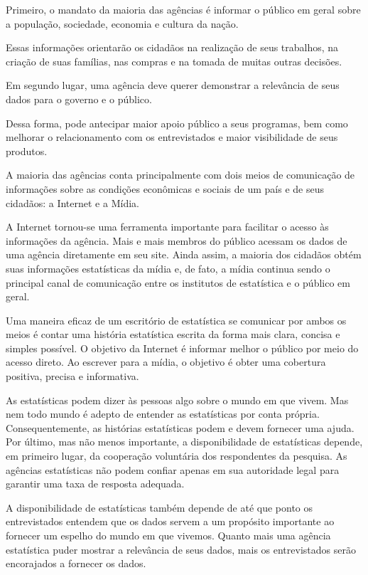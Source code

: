 Primeiro, o mandato da maioria das agências é informar o público em geral sobre a população, sociedade, economia e cultura da nação.\vskip0.3cm 

Essas informações orientarão os cidadãos na realização de seus trabalhos, na criação de suas famílias, nas compras e na tomada de muitas outras decisões.\vskip0.3cm 

Em segundo lugar, uma agência deve querer demonstrar a relevância de seus dados para o governo e o público.\vskip0.3cm 

Dessa forma, pode antecipar maior apoio público a seus programas, bem como melhorar o relacionamento com os entrevistados e maior visibilidade de seus produtos.\vskip0.3cm 

A maioria das agências conta principalmente com dois meios de comunicação de informações sobre as condições econômicas e sociais de um país e de seus cidadãos: a Internet e a Mídia.



\newpage
A Internet tornou-se uma ferramenta importante para facilitar o acesso às informações da agência. Mais e mais membros do público acessam os dados de uma agência diretamente em seu site. Ainda assim, a maioria dos cidadãos obtém suas informações estatísticas da mídia e, de fato, a mídia continua sendo o principal canal de comunicação entre os institutos de estatística e o público em geral.\vskip0.3cm 


Uma maneira eficaz de um escritório de estatística se comunicar por ambos os meios é contar uma história estatística escrita da forma mais clara, concisa e simples possível. O objetivo da Internet é informar melhor o público por meio do acesso direto. Ao escrever para a mídia, o objetivo é obter uma cobertura positiva, precisa e informativa.\vskip0.3cm 

As estatísticas podem dizer às pessoas algo sobre o mundo em que vivem. Mas nem todo mundo é adepto de entender as estatísticas por conta própria. Consequentemente, as histórias estatísticas podem e devem fornecer uma ajuda.
Por último, mas não menos importante, a disponibilidade de estatísticas depende, em primeiro lugar, da cooperação voluntária dos respondentes da pesquisa. As agências estatísticas não podem confiar apenas em sua autoridade legal para garantir uma taxa de resposta adequada.\vskip0.3cm 


A disponibilidade de estatísticas também depende de até que ponto os entrevistados entendem que os dados servem a um propósito importante ao fornecer um espelho do mundo em que vivemos. Quanto mais uma agência estatística puder mostrar a relevância de seus dados, mais os entrevistados serão encorajados a fornecer os dados.\vskip0.3cm 

